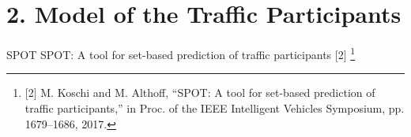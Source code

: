 \documentclass[shortpres,aspectratio=43]{beamer}
\newcommand\blfootnote[1]{%
  \begingroup
  \renewcommand\thefootnote{}\footnote{#1}%
  \addtocounter{footnote}{-1}%
  \endgroup
}
\begin{document}


\section{2. Model of the Traffic Participants}

\begin{frame}{SPOT}
SPOT: A tool for set-based prediction of traffic participants $[$2$]$\blfootnote{\tiny $[$2$]$ M. Koschi and M. Althoff, ``SPOT: A tool for set-based prediction of traffic participants,'' in Proc. of the IEEE Intelligent Vehicles Symposium, pp. 1679--1686, 2017.}%
\vspace{1em}


\end{frame}
\end{document}
